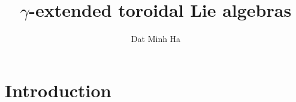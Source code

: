 

\setcounter{section}{-1}


\newcommand{\toroidal}{\t}
\newcommand{\extendedtoroidal}{\hat{\t}}
\newcommand{\simpleroots}{\mathbb{I}}
\newcommand{\divzero}{\der_{\gamma}(A)}



    \title{\texorpdfstring{$\gamma$}{}-extended toroidal Lie algebras}
    
    \author{Dat Minh Ha}
    \maketitle
    
    \begin{abstract}
    
    \end{abstract}
    
    {
    \hypersetup{} 
    \tableofcontents %
    }

    \listoftodos

    \section{Introduction}

    

    

    

    

    \begin{appendices}
        
    \end{appendices}
    
    \printbibliography

